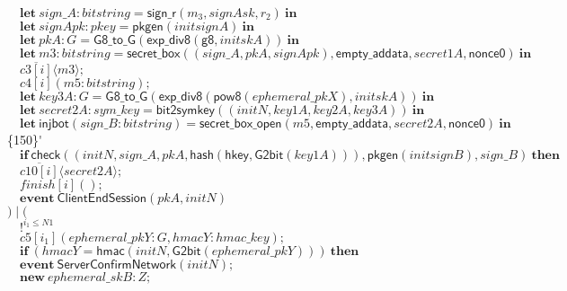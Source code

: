 \documentclass{article}
\newcommand{\cinput}[2]{{#1}({#2})}
\newcommand{\coutput}[2]{\overline{#1}\langle{#2}\rangle}
\newcommand{\kw}[1]{\mathbf{#1}}
\newcommand{\kwf}[1]{\mathsf{#1}}
\newcommand{\var}[1]{\mathit{#1}}
\newcommand{\kwt}[1]{\mathit{#1}}
\newcommand{\kwp}[1]{\mathit{#1}}
\newcommand{\kwc}[1]{\mathit{#1}}
\begin{document}
\begin{tabbing}
\>$\quad \kw{let}\ \var{sign{\_}A}: \kwt{bitstring} = \kwf{sign{\_}r}(\var{m}_{3}, \var{signAsk}, \var{r}_{2})\ \kw{in}$\\
\>$\quad \kw{let}\ \var{signApk}: \kwt{pkey} = \kwf{pkgen}(\var{initsignA})\ \kw{in}$\\
\>$\quad \kw{let}\ \var{pkA}: \kwt{G} = \kwf{G8{\_}to{\_}G}(\kwf{exp{\_}div8}(\kwf{g8}, \var{initskA}))\ \kw{in}$\\
\>$\quad \kw{let}\ \var{m3}: \kwt{bitstring} = \kwf{secret{\_}box}(\kwf{}(\var{sign{\_}A}, \var{pkA}, \var{signApk}), \kwf{empty{\_}addata}, \var{secret1A}, \kwf{nonce0})\ \kw{in}$\\
\>$\quad \coutput{\kwc{c3}[\var{i}]}{\var{m3}};$\\
\>$\quad \cinput{\kwc{c4}[\var{i}]}{\var{m5}: \kwt{bitstring}};$\\
\>$\quad \kw{let}\ \var{key3A}: \kwt{G} = \kwf{G8{\_}to{\_}G}(\kwf{exp{\_}div8}(\kwf{pow8}(\var{ephemeral{\_}pkX}), \var{initskA}))\ \kw{in}$\\
\>$\quad \kw{let}\ \var{secret2A}: \kwt{sym{\_}key} = \kwf{bit2symkey}(\kwf{}(\var{initN}, \var{key1A}, \var{key2A}, \var{key3A}))\ \kw{in}$\\
\>$\quad \kw{let}\ \kwf{injbot}(\var{sign{\_}B}: \kwt{bitstring}) = \kwf{secret{\_}box{\_}open}(\var{m5}, \kwf{empty{\_}addata}, \var{secret2A}, \kwf{nonce0})\ \kw{in}$\\
\>\{150\}\'$\quad \kw{if}\ \kwf{check}(\kwf{}(\var{initN}, \var{sign{\_}A}, \var{pkA}, \kwf{hash}(\kwf{hkey}, \kwf{G2bit}(\var{key1A}))), \kwf{pkgen}(\var{initsignB}), \var{sign{\_}B})\ \kw{then}$\\
\>$\quad \coutput{\kwc{c10}[\var{i}]}{\var{secret2A}};$\\
\>$\quad \cinput{\kwc{finish}[\var{i}]}{};$\\
\>$\quad \kw{event}\ \kwf{ClientEndSession}(\var{pkA}, \var{initN})$\\
\>$) \mid ($\\
\>$\quad !^{\var{i}_{1} \leq \kwp{N1}}$\\
\>$\quad \cinput{\kwc{c5}[\var{i}_{1}]}{\var{ephemeral{\_}pkY}: \kwt{G}, \var{hmacY}: \kwt{hmac{\_}key}};$\\
\>$\quad \kw{if}\ (\var{hmacY}  =  \kwf{hmac}(\var{initN}, \kwf{G2bit}(\var{ephemeral{\_}pkY})))\ \kw{then}$\\
\>$\quad \kw{event}\ \kwf{ServerConfirmNetwork}(\var{initN});$\\
\>$\quad \kw{new}\ \var{ephemeral{\_}skB}: \kwt{Z};$\\

\end{tabbing}
\end{document}
